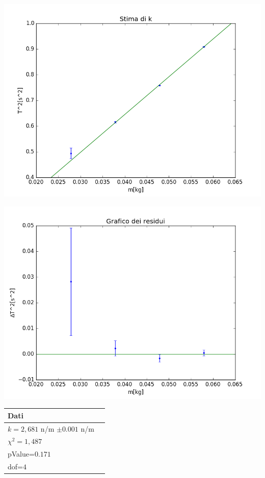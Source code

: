 \documentclass{exam}
\begin{document}
			\begin{minipage}{0.5\textwidth}
				\includegraphics[width=\textwidth]{fit_k}
				\end{minipage}
			\begin{minipage}{0.5\textwidth}
				\includegraphics[width=\textwidth]{red_k}
			\end{minipage}
			\begin{center}
				\begin{tabular}{ll}
					\toprule
					Dati \\
					\midrule
					$k=2,681$ n/m $\pm0.001$ n/m\\
					$\chi^2=1,487$\\
					pValue=$0.171$\\
					dof=$4$\\		
					\bottomrule
				\end{tabular}
			\end{center}
\end{document}
